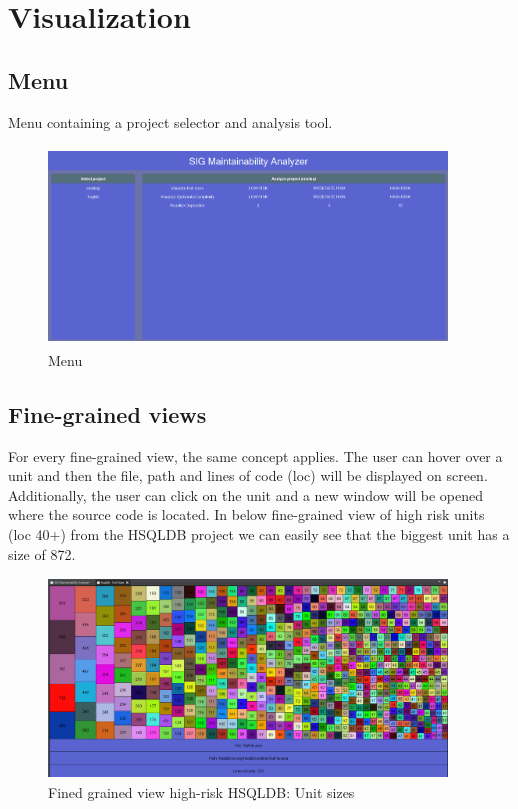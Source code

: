 \documentclass{article}
\begin{document}
\section{Visualization}
\label{appendix:visualization}
\subsection{Menu}
Menu containing a project selector and analysis tool.
\begin{figure}[!htbp]
	\centering
	\label{fig:vis-menu}
	\caption{Menu}
	\includegraphics[width=400px, height=200px]{vis_menu.png}
\end{figure}

\subsection{Fine-grained views}
For every fine-grained view, the same concept applies. 
The user can hover over a unit and then the file, path and lines of code (loc) will be displayed on screen. 
Additionally, the user can click on the unit and a new window will be opened where the source code is located.
In below fine-grained view of high risk units (loc 40+) from the HSQLDB project we can easily see that the biggest unit has a size of 872. 

\begin{figure}[!htbp]
	\centering
	\label{fig:unit-sizes}
	\caption{Fined grained view high-risk HSQLDB: Unit sizes}
	\includegraphics[width=400px, height=200px]{hsqldb_unitsizes.png}
\end{figure}
\end{document}

